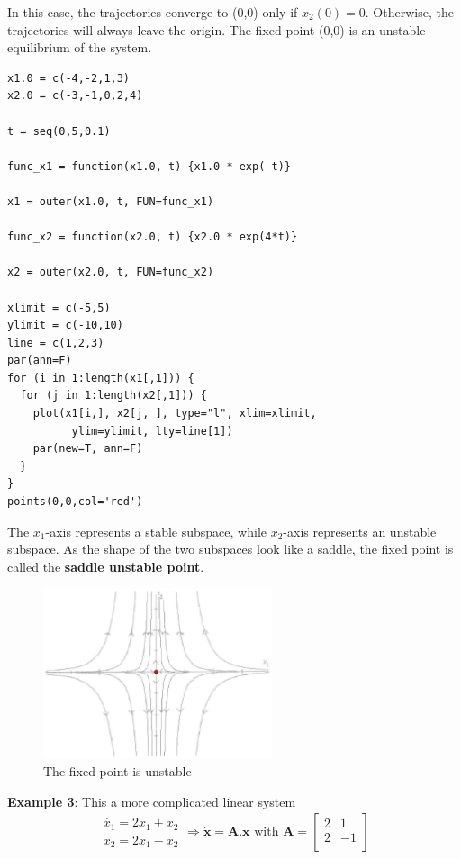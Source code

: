 In this case, the trajectories converge to (0,0) only if $x_2(0) =
0$. Otherwise, the trajectories will always leave the origin. The
fixed point (0,0) is an unstable equilibrium of the system. 
\begin{lstlisting}
x1.0 = c(-4,-2,1,3)
x2.0 = c(-3,-1,0,2,4)

t = seq(0,5,0.1)

func_x1 = function(x1.0, t) {x1.0 * exp(-t)}

x1 = outer(x1.0, t, FUN=func_x1)

func_x2 = function(x2.0, t) {x2.0 * exp(4*t)}

x2 = outer(x2.0, t, FUN=func_x2)

xlimit = c(-5,5)
ylimit = c(-10,10)
line = c(1,2,3)
par(ann=F)
for (i in 1:length(x1[,1])) {
  for (j in 1:length(x2[,1])) {
    plot(x1[i,], x2[j, ], type="l", xlim=xlimit, 
          ylim=ylimit, lty=line[1])
    par(new=T, ann=F)
  }
}
points(0,0,col='red')
\end{lstlisting}
The $x_1$-axis represents a stable subspace, while $x_2$-axis
represents an unstable subspace. As the shape of the two subspaces
look like a saddle, the fixed point is called the {\bf saddle
unstable point}.
\begin{figure}[htb]
  \centerline{\includegraphics[height=5cm]{./images/saddle_point.eps}}
  \caption{The fixed point is unstable}\label{fig:saddle_unstable}
\end{figure}

{\bf Example 3}: This a more complicated linear system
\begin{equation}
  \label{eq:1062}
  \begin{split}
    \begin{array}{c}
          \dot{x_1} = 2x_1 + x_2 \\
    \dot{x_2} = 2x_1 - x_2
    \end{array}
\Rightarrow
\mathbf{\dot{x} = A.x}
\text{ with } \mathbf{A} = \left[
\begin{array}{cc}
  2 & 1 \\
  2 & -1 \\
\end{array}
\right]
  \end{split}
\end{equation}

